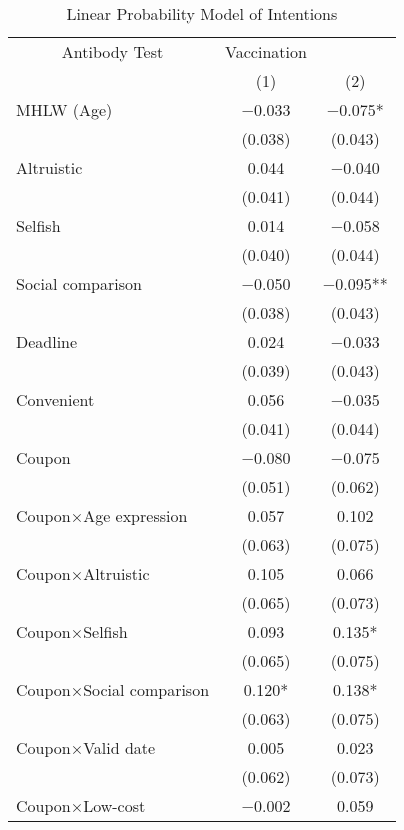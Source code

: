 \begin{table}

\caption{Linear Probability Model of Intentions \label{tab:int-reg}}
\centering
\fontsize{9}{11}\selectfont
\begin{threeparttable}
\begin{tabular}[t]{lcc}
\toprule
\multicolumn{1}{c}{Antibody Test} & \multicolumn{1}{c}{Vaccination} \\
\cmidrule(l{3pt}r{3pt}){1-1} \cmidrule(l{3pt}r{3pt}){2-2}
  & (1) & (2)\\
\midrule
MHLW (Age) & \num{-0.033} & \num{-0.075}*\\
 & (\num{0.038}) & \vphantom{1} (\num{0.043})\\
Altruistic & \num{0.044} & \num{-0.040}\\
 & (\num{0.041}) & \vphantom{1} (\num{0.044})\\
Selfish & \num{0.014} & \num{-0.058}\\
 & (\num{0.040}) & (\num{0.044})\\
Social comparison & \num{-0.050} & \num{-0.095}**\\
 & (\num{0.038}) & (\num{0.043})\\
Deadline & \num{0.024} & \num{-0.033}\\
 & (\num{0.039}) & (\num{0.043})\\
Convenient & \num{0.056} & \num{-0.035}\\
 & (\num{0.041}) & (\num{0.044})\\
Coupon & \num{-0.080} & \num{-0.075}\\
 & (\num{0.051}) & (\num{0.062})\\
Coupon×Age expression & \num{0.057} & \num{0.102}\\
 & (\num{0.063}) & \vphantom{1} (\num{0.075})\\
Coupon×Altruistic & \num{0.105} & \num{0.066}\\
 & (\num{0.065}) & (\num{0.073})\\
Coupon×Selfish & \num{0.093} & \num{0.135}*\\
 & (\num{0.065}) & (\num{0.075})\\
Coupon×Social comparison & \num{0.120}* & \num{0.138}*\\
 & (\num{0.063}) & (\num{0.075})\\
Coupon×Valid date & \num{0.005} & \num{0.023}\\
 & (\num{0.062}) & (\num{0.073})\\
Coupon×Low-cost & \num{-0.002} & \num{0.059}\\

\end{tabular}
\end{threeparttable}
\end{table}
